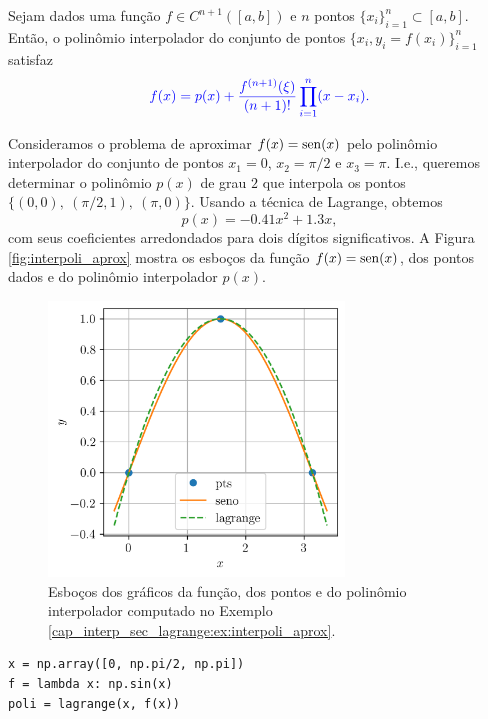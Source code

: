 \begin{teo}\label{cap_interp_sec_lagrange:teo:lagrange}
  Sejam dados uma função $f\in C^{n+1}([a, b])$ e $n$ pontos $\{x_i\}_{i=1}^n\subset [a, b]$. Então, o polinômio interpolador do conjunto de pontos $\{x_i, y_i=f(x_i)\}_{i=1}^n$ satisfaz
  \begin{equation}\color{blue}f(x) = p(x) + \frac{f^{(n+1)}(\xi)}{(n+1)!}\prod_{i=1}^n(x-x_i).
  \end{equation}
\end{teo}

\begin{ex}\label{cap_interp_sec_lagrange:ex:interpoli_aprox}
  Consideramos o problema de aproximar $f(x) = \operatorname{sen}(x)$ pelo polinômio interpolador do conjunto de pontos $x_1=0$, $x_2=\pi/2$ e $x_3=\pi$. I.e., queremos determinar o polinômio $p(x)$ de grau $2$ que interpola os pontos $\{(0, 0),~(\pi/2, 1),~(\pi, 0)\}$. Usando a técnica de Lagrange, obtemos
  \begin{equation}
    p(x) = -0.41x^2 + 1.3x,
  \end{equation}
com seus coeficientes arredondados para dois dígitos significativos. A Figura \ref{fig:interpoli_aprox} mostra os esboços da função $f(x)=\operatorname{sen}(x)$, dos pontos dados e do polinômio interpolador $p(x)$.

\begin{figure}[H]
  \centering
  \includegraphics[width=0.7\textwidth]{./cap_interp/dados/fig_poliLagrange/fig}
  \caption{Esboços dos gráficos da função, dos pontos e do polinômio interpolador computado no Exemplo \ref{cap_interp_sec_lagrange:ex:interpoli_aprox}.}
  \label{cap_interp_sec_lagrange:fig:interpoli_aprox}
\end{figure}

\begin{lstlisting}
x = np.array([0, np.pi/2, np.pi])
f = lambda x: np.sin(x)
poli = lagrange(x, f(x))
\end{lstlisting}

\end{ex}

